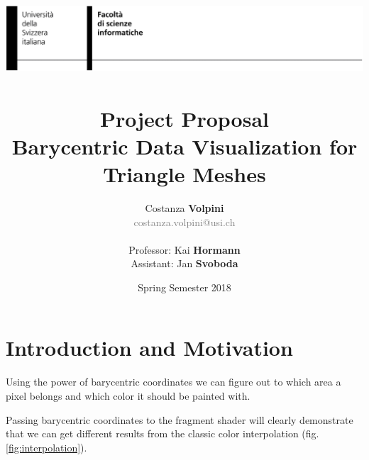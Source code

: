 \documentclass[11pt]{article}
\title{ \includegraphics[width=\linewidth]{header.png}~ 
\\[0.5cm]
  \huge{Project Proposal} \\
\textbf{\Large{Barycentric Data Visualization for Triangle Meshes}}}
\date{Spring Semester 2018}
\author{Costanza \textbf{Volpini} \\ \textcolor{gray}{costanza.volpini@usi.ch} \\ \\ Professor: Kai \textbf{Hormann} \\ Assistant: Jan \textbf{Svoboda}}
\begin{document}
\pagestyle{fancy}
\maketitle

\section{Introduction and Motivation}

Using the power of barycentric coordinates we can figure out to which area a pixel belongs and which 
color it should be painted with. 

Passing barycentric coordinates to the fragment shader will clearly demonstrate that we can get different results from the classic 
color interpolation (fig.\ref{fig:interpolation}).
\end{document}
